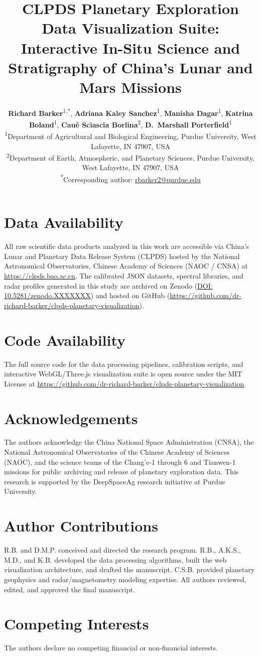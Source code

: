 \documentclass{npj-article}
\title{CLPDS Planetary Exploration Data Visualization Suite: Interactive In-Situ Science and Stratigraphy of China's Lunar and Mars Missions}
\author{%
  \textbf{Richard Barker}\textsuperscript{1,*},
  \textbf{Adriana Kaley Sanchez}\textsuperscript{1},
  \textbf{Manisha Dagar}\textsuperscript{1},
  \textbf{Katrina Boland}\textsuperscript{1},
  \textbf{Cau\^{e} Sciascia Borlina}\textsuperscript{2},
  \textbf{D.~Marshall Porterfield}\textsuperscript{1}
  \vspace{2mm}\\
  \textsuperscript{1}\footnotesize Department of Agricultural and Biological Engineering, Purdue University, West Lafayette, IN 47907, USA\\
  \textsuperscript{2}\footnotesize Department of Earth, Atmospheric, and Planetary Sciences, Purdue University, West Lafayette, IN 47907, USA\\
  \textsuperscript{*}\footnotesize Corresponding author: \href{mailto:rbarker2@purdue.edu}{rbarker2@purdue.edu}
}
\begin{document}
\makefrontmatter







\section*{Data Availability}
All raw scientific data products analyzed in this work are accessible via China's Lunar and Planetary Data Release System (CLPDS) hosted by the National Astronomical Observatories, Chinese Academy of Sciences (NAOC / CNSA) at \url{https://clpds.bao.ac.cn}. The calibrated JSON datasets, spectral libraries, and radar profiles generated in this study are archived on Zenodo (\href{https://doi.org/10.5281/zenodo.XXXXXXX}{DOI: 10.5281/zenodo.XXXXXXX}) and hosted on GitHub (\url{https://github.com/dr-richard-barker/clpds-planetary-visualization}).

\section*{Code Availability}
The full source code for the data processing pipelines, calibration scripts, and interactive WebGL/Three.js visualization suite is open source under the MIT License at \url{https://github.com/dr-richard-barker/clpds-planetary-visualization}.

\section*{Acknowledgements}
The authors acknowledge the China National Space Administration (CNSA), the National Astronomical Observatories of the Chinese Academy of Sciences (NAOC), and the science teams of the Chang'e-1 through 6 and Tianwen-1 missions for public archiving and release of planetary exploration data. This research is supported by the DeepSpaceAg research initiative at Purdue University.

\section*{Author Contributions}
R.B. and D.M.P. conceived and directed the research program. R.B., A.K.S., M.D., and K.B. developed the data processing algorithms, built the web visualization architecture, and drafted the manuscript. C.S.B. provided planetary geophysics and radar/magnetometry modeling expertise. All authors reviewed, edited, and approved the final manuscript.

\section*{Competing Interests}
The authors declare no competing financial or non-financial interests.

\renewcommand{\bibnumfmt}[1]{#1.}


\end{document}
